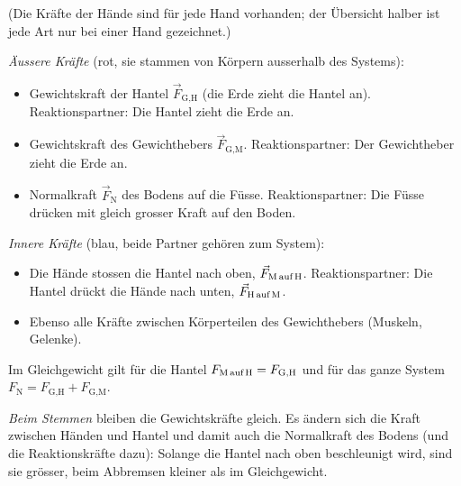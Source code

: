 \begin{center}
\end{center}
(Die Kräfte der Hände sind für jede Hand vorhanden; der Übersicht halber ist jede Art nur bei einer Hand gezeichnet.)

\emph{Äussere Kräfte} (rot, sie stammen von Körpern ausserhalb des Systems):
\begin{itemize}
\item Gewichtskraft der Hantel $\vec F_\text{G,H}$ (die Erde zieht die Hantel an). Reaktionspartner: Die Hantel zieht die Erde an.
\item Gewichtskraft des Gewichthebers $\vec F_\text{G,M}$. Reaktionspartner: Der Gewichtheber zieht die Erde an.
\item Normalkraft $\vec F_\text{N}$ des Bodens auf die Füsse. Reaktionspartner: Die Füsse drücken mit gleich grosser Kraft auf den Boden.
\end{itemize}

\emph{Innere Kräfte} (blau, beide Partner gehören zum System):
\begin{itemize}
\item Die Hände stossen die Hantel nach oben, $\vec F_\text{M\,auf\,H}$. Reaktionspartner: Die Hantel drückt die Hände nach unten, $\vec F_\text{H\,auf\,M}$.
\item Ebenso alle Kräfte zwischen Körperteilen des Gewichthebers (Muskeln, Gelenke).
\end{itemize}

Im Gleichgewicht gilt für die Hantel $F_\text{M\,auf\,H} = F_\text{G,H}$ und für das ganze System $F_\text{N} = F_\text{G,H}+F_\text{G,M}$.

\emph{Beim Stemmen} bleiben die Gewichtskräfte gleich. Es ändern sich die Kraft zwischen Händen und Hantel und damit auch die Normalkraft des Bodens (und die Reaktionskräfte dazu): Solange die Hantel nach oben beschleunigt wird, sind sie grösser, beim Abbremsen kleiner als im Gleichgewicht.
